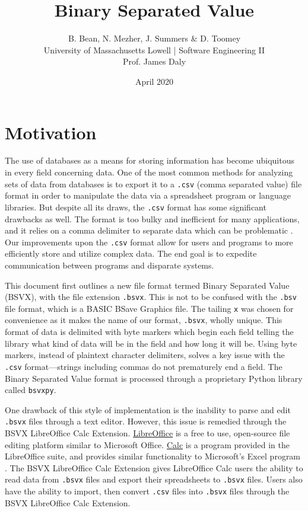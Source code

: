 \documentclass[10pt]{article}
\begin{document}
\title{Binary Separated Value}
\author{B. Bean, N. Mezher, J. Summers \& D. Toomey\\University of Massachusetts Lowell | Software Engineering II\\Prof. James Daly}
\date{April 2020}
\maketitle

\section*{Motivation}

The use of databases as a means for storing information has become ubiquitous in every field concerning data.
One of the most common methods for analyzing sets of data from databases is to export it to a \texttt{.csv} (comma separated value) file format in order to manipulate the data via a spreadsheet program or language libraries.
But despite all its draws, the \texttt{.csv} format has some significant drawbacks as well.
The format is too bulky and inefficient for many applications, and it relies on a comma delimiter to separate data which can be problematic \cite{Coleman2011}.
Our improvements upon the \texttt{.csv} format allow for users and programs to more efficiently store and utilize complex data.
The end goal is to expedite communication between programs and disparate systems.

\indent{}
This document first outlines a new file format termed Binary Separated Value (BSVX), with the file extension \texttt{.bsvx}.
This is not to be confused with the \texttt{.bsv} file format, which is a BASIC BSave Graphics file.
The tailing \texttt{x} was chosen for convenience as it makes the name of our format, \texttt{.bsvx}, wholly unique.
This format of data is delimited with byte markers which begin each field telling the library what kind of data will be in the field and how long it will be.
Using byte markers, instead of plaintext character delimiters, solves a key issue with the \texttt{.csv} format---strings including commas do not prematurely end a field.
The Binary Separated Value format is processed through a proprietary Python library called \texttt{bsvxpy}.

\indent{}
One drawback of this style of implementation is the inability to parse and edit \texttt{.bsvx} files through a text editor.
However, this issue is remedied through the BSVX LibreOffice Calc Extension.
\href{https://www.libreoffice.org/discover/libreoffice/}{LibreOffice} is a free to use, open-source file editing platform similar to Microsoft Office.
\href{https://www.libreoffice.org/discover/calc/}{Calc} is a program provided in the LibreOffice suite, and provides similar functionality to Microsoft’s Excel program \cite{Guthrie2012}.
The BSVX LibreOffice Calc Extension gives LibreOffice Calc users the ability to read data from \texttt{.bsvx} files and export their spreadsheets to \texttt{.bsvx} files.
Users also have the ability to import, then convert \texttt{.csv} files into \texttt{.bsvx} files through the BSVX LibreOffice Calc Extension.
\end{document}
